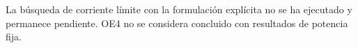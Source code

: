 La búsqueda de corriente límite con la formulación explícita no se ha ejecutado y permanece pendiente. OE4 no se considera concluido con resultados de potencia fija.
